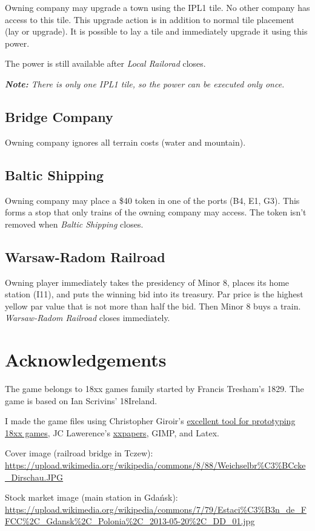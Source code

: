 \documentclass[10pt,a4paper,twocolumn]{article}
\begin{document}
Owning company may upgrade a town using the IPL1 tile. No other company has access to this tile. This upgrade action is in addition to normal tile placement (lay or upgrade). It is possible to lay a tile and immediately upgrade it using this power. 

The power is still available after \textit{Local Railorad} closes.

\textit{\textbf{Note:} There is only one IPL1 tile, so the power can be executed only once.}

\subsection{Bridge Company}

Owning company ignores all terrain costs (water and mountain).

\subsection{Baltic Shipping}

Owning company may place a \$40 token in one of the ports (B4, E1, G3). This forms a stop that only trains of the owning company may access. The token isn't removed when \textit{Baltic Shipping} closes.

\subsection{Warsaw-Radom Railroad}

Owning player immediately takes the presidency of Minor 8, places its home station (I11), and puts the winning bid into its treasury. Par price is the highest yellow par value that is not more than half the bid. Then Minor 8 buys a train. \textit{Warsaw-Radom Railroad} closes immediately.

\section{Acknowledgements}

The game belongs to 18xx games family started by Francis Tresham's 1829. The game is based on Ian Scrivins' 18Ireland.

I made the game files using Christopher Giroir's \href{https://github.com/kelsin/18xx}{excellent tool for prototyping 18xx games}, JC Lawerence's \href{https://github.com/clearclaw/xxpaper}{xxpapers}, GIMP, and Latex.

Cover image (railroad bridge in Tczew): \url{https://upload.wikimedia.org/wikipedia/commons/8/88/Weichselbr\%C3\%BCcke_Dirschau.JPG}

Stock market image (main station in Gdańsk): \url{https://upload.wikimedia.org/wikipedia/commons/7/79/Estaci\%C3\%B3n_de_FFCC\%2C_Gdansk\%2C_Polonia\%2C_2013-05-20\%2C_DD_01.jpg}
\end{document}
